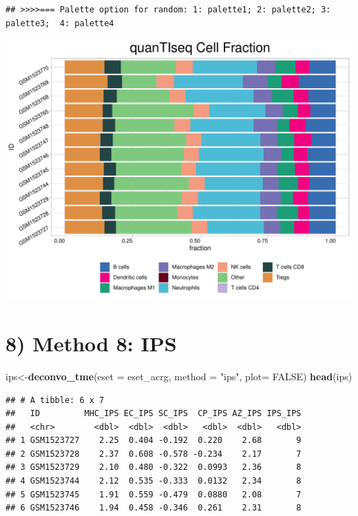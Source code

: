 \documentclass[
  12pt,
]{book}
\newenvironment{Shaded}{\begin{snugshade}}{\end{snugshade}}
\newcommand{\AttributeTok}[1]{\textcolor[rgb]{0.13,0.29,0.53}{#1}}
\newcommand{\ConstantTok}[1]{\textcolor[rgb]{0.56,0.35,0.01}{#1}}
\newcommand{\FunctionTok}[1]{\textcolor[rgb]{0.13,0.29,0.53}{\textbf{#1}}}
\newcommand{\NormalTok}[1]{#1}
\newcommand{\OtherTok}[1]{\textcolor[rgb]{0.56,0.35,0.01}{#1}}
\newcommand{\StringTok}[1]{\textcolor[rgb]{0.31,0.60,0.02}{#1}}
\theoremstyle{definition}
\theoremstyle{definition}
\theoremstyle{definition}
\theoremstyle{definition}
\theoremstyle{remark}
\begin{document}
\begin{verbatim}
## >>>>=== Palette option for random: 1: palette1; 2: palette2; 3: palette3;  4: palette4
\end{verbatim}

\includegraphics{_main_files/figure-latex/unnamed-chunk-57-1.pdf}

\hypertarget{method-8-ips}{%
\section{8) Method 8: IPS}\label{method-8-ips}}

\begin{Shaded}
\begin{Highlighting}[]
\NormalTok{ips}\OtherTok{\textless{}{-}}\FunctionTok{deconvo\_tme}\NormalTok{(}\AttributeTok{eset =}\NormalTok{ eset\_acrg, }\AttributeTok{method =} \StringTok{"ips"}\NormalTok{, }\AttributeTok{plot=} \ConstantTok{FALSE}\NormalTok{)}
\FunctionTok{head}\NormalTok{(ips)}
\end{Highlighting}
\end{Shaded}

\begin{verbatim}
## # A tibble: 6 x 7
##   ID         MHC_IPS EC_IPS SC_IPS  CP_IPS AZ_IPS IPS_IPS
##   <chr>        <dbl>  <dbl>  <dbl>   <dbl>  <dbl>   <dbl>
## 1 GSM1523727    2.25  0.404 -0.192  0.220    2.68       9
## 2 GSM1523728    2.37  0.608 -0.578 -0.234    2.17       7
## 3 GSM1523729    2.10  0.480 -0.322  0.0993   2.36       8
## 4 GSM1523744    2.12  0.535 -0.333  0.0132   2.34       8
## 5 GSM1523745    1.91  0.559 -0.479  0.0880   2.08       7
## 6 GSM1523746    1.94  0.458 -0.346  0.261    2.31       8
\end{verbatim}
\end{document}
